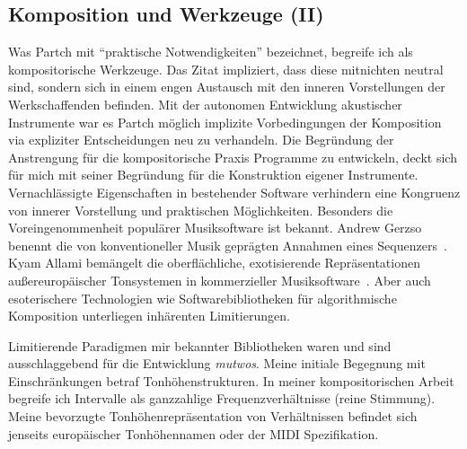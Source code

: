 \documentclass[12pt,a4paper,ngerman]{article}
\begin{document}
\subsection{Komposition und Werkzeuge (II)}

\noindent
Was Partch mit ``praktische Notwendigkeiten'' bezeichnet, begreife ich als kompositorische Werkzeuge.
Das Zitat impliziert, dass diese mitnichten neutral sind, sondern sich in einem engen Austausch mit den inneren Vorstellungen der Werkschaffenden befinden.
Mit der autonomen Entwicklung akustischer Instrumente war es Partch möglich implizite Vorbedingungen der Komposition via expliziter Entscheidungen neu zu verhandeln.
Die Begründung der Anstrengung für die kompositorische Praxis Programme zu entwickeln, deckt sich für mich mit seiner Begründung für die Konstruktion eigener Instrumente.
Vernachlässigte Eigenschaften in bestehender Software verhindern eine Kongruenz von innerer Vorstellung und praktischen Möglichkeiten.
Besonders die Voreingenommenheit populärer Musiksoftware ist bekannt.
Andrew Gerzso benennt die von konventioneller Musik geprägten Annahmen eines Sequenzers~\parencite[S. 78]{paradigmsAndComputerMusic}.
Kyam Allami bemängelt die oberflächliche, exotisierende Repräsentationen außereuropäischer Tonsystemen in kommerzieller Musiksoftware~\parencite[S. 59f]{microtonalityAndTheStruggle}.
Aber auch esoterischere Technologien wie Softwarebibliotheken für algorithmische Komposition unterliegen inhärenten Limitierungen.

\bigskip

\noindent
Limitierende Paradigmen mir bekannter Bibliotheken waren und sind ausschlaggebend für die Entwicklung \emph{mutwos}.
Meine initiale Begegnung mit Einschränkungen betraf Tonhöhenstrukturen.
In meiner kompositorischen Arbeit begreife ich Intervalle als ganzzahlige Frequenzverhältnisse (reine Stimmung).
Meine bevorzugte Tonhöhenrepräsentation von Verhältnissen befindet sich jenseits europäischer Tonhöhennamen oder der MIDI Spezifikation.
\end{document}
